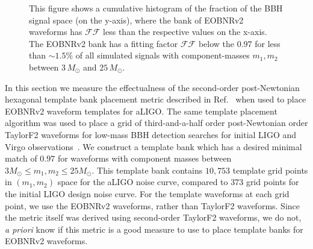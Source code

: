 \begin{figure}
	\begin{center}
	\end{center}
\caption{This figure shows a cumulative histogram of the fraction of the BBH
signal space (on the y-axis), where the bank of EOBNRv2 waveforms has
$\mathcal{FF}$ less than the respective values on the x-axis.  The EOBNRv2
bank has a fitting factor $\mathcal{FF}$ below the $0.97$ for less than $\sim
1.5\%$ of all simulated signals with component-masses $m_1, m_2$ between
$3\, M_\odot$ and $25\,M_{\odot}$.} \label{fig:cumhist_eobeob_all}
\end{figure} 

In this section we measure the effectualness of the second-order
post-Newtonian hexagonal template bank placement metric described in
Ref.~\cite{BabaketalBankPlacement} when used to place EOBNRv2 waveform
templates for aLIGO.  The same template placement algorithm was used to place
a grid of third-and-a-half order post-Newtonian order TaylorF2 waveforms for
low-mass BBH detection searches for initial LIGO and Virgo
observations~\cite{Colaboration:2011nz,Abadie:2010yb,Abbott:2009qj,Abbott:2009tt,Messaritaki:2005wv}.
We construct a template bank which
has a desired minimal match of $0.97$ for waveforms with component masses
between $3 M_\odot \le m_1, m_2 \le 25 M_\odot$. This template
bank contains $10,753$ template grid points in $(m_1,m_2)$ space for the aLIGO noise curve, 
compared to $373$ grid points for the initial LIGO design noise
curve. For the template waveforms at each grid point, we use the EOBNRv2
waveforms, rather than TaylorF2 waveforms.  Since the metric itself was
derived using second-order TaylorF2 waveforms, we do not, \textit{a priori}
know if this metric is a good measure to use to place template banks for
EOBNRv2 waveforms. 

